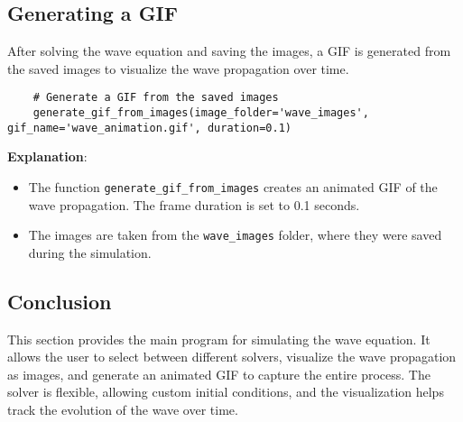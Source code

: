 \documentclass[a4paper, 11pt]{article}
\begin{document}
\subsection{Generating a GIF}

After solving the wave equation and saving the images, a GIF is generated from the saved images to visualize the wave propagation over time.

\lstset{language=Python}
\begin{lstlisting}
	# Generate a GIF from the saved images
	generate_gif_from_images(image_folder='wave_images', gif_name='wave_animation.gif', duration=0.1)
\end{lstlisting}

\textbf{Explanation}:
\begin{itemize}
	\item The function \texttt{generate\_gif\_from\_images} creates an animated GIF of the wave propagation. The frame duration is set to 0.1 seconds.
	\item The images are taken from the \texttt{wave\_images} folder, where they were saved during the simulation.
\end{itemize}

\subsection{Conclusion}

This section provides the main program for simulating the wave equation. It allows the user to select between different solvers, visualize the wave propagation as images, and generate an animated GIF to capture the entire process. The solver is flexible, allowing custom initial conditions, and the visualization helps track the evolution of the wave over time.



	
\end{document}
